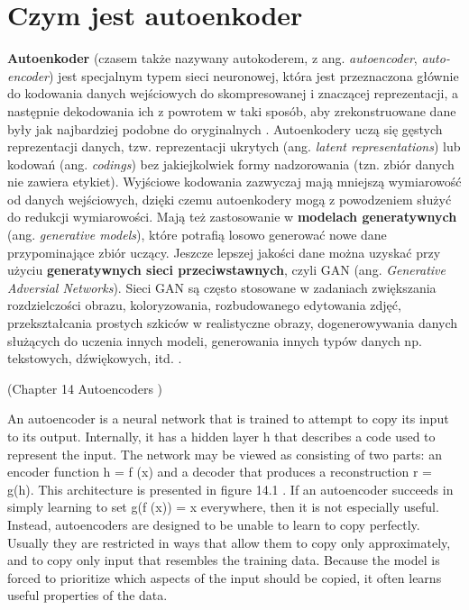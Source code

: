 \documentclass[12pt]{mwbk}
\theoremstyle{plain}
\theoremstyle{definition}
\theoremstyle{remark}
\begin{document}
\section{Czym jest autoenkoder}

	\textbf{Autoenkoder} (czasem także nazywany autokoderem, z ang. \textit{autoencoder}, \textit{auto-encoder}) jest specjalnym typem sieci neuronowej, która jest przeznaczona głównie do kodowania danych wejściowych do skompresowanej i znaczącej reprezentacji, a następnie dekodowania ich z powrotem w taki sposób, aby zrekonstruowane dane były jak najbardziej podobne do oryginalnych \cite{bank}. Autoenkodery uczą się gęstych reprezentacji danych, tzw. reprezentacji ukrytych (ang. \emph{latent representations}) lub kodowań (ang. \emph{codings}) bez jakiejkolwiek formy nadzorowania (tzn. zbiór danych nie zawiera etykiet). Wyjściowe kodowania zazwyczaj mają mniejszą wymiarowość od danych wejściowych, dzięki czemu autoenkodery mogą z powodzeniem służyć do redukcji wymiarowości. Mają też zastosowanie w \textbf{modelach generatywnych} (ang. \emph{generative models}), które potrafią losowo generować nowe dane przypominające zbiór uczący. Jeszcze lepszej jakości dane można uzyskać przy użyciu \textbf{generatywnych sieci przeciwstawnych}, czyli GAN (ang. \textit{Generative Adversial Networks}). Sieci GAN są często stosowane w zadaniach zwiększania rozdzielczości obrazu, koloryzowania, rozbudowanego edytowania zdjęć, przekształcania prostych szkiców w realistyczne obrazy, dogenerowywania danych służących do uczenia innych modeli, generowania innych typów danych np. tekstowych, dźwiękowych, itd. \cite{geron}.


(Chapter 14 Autoencoders \cite{goodfellow})

An autoencoder is a neural network that is trained to attempt to copy its input
to its output. Internally, it has a hidden layer h that describes a code used to
represent the input. The network may be viewed as consisting of two parts: an
encoder function h = f (x) and a decoder that produces a reconstruction r = g(h).
This architecture is presented in figure 14.1 . If an autoencoder succeeds in simply
learning to set g(f (x)) = x everywhere, then it is not especially useful. Instead,
autoencoders are designed to be unable to learn to copy perfectly. Usually they are
restricted in ways that allow them to copy only approximately, and to copy only
input that resembles the training data. Because the model is forced to prioritize
which aspects of the input should be copied, it often learns useful properties of the
data.
\end{document}
